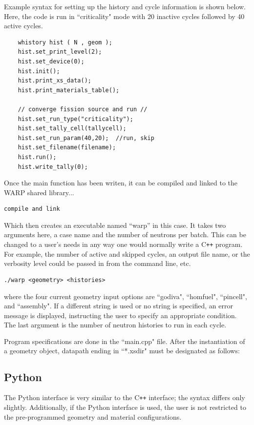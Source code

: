 \documentclass[twoside,a4paper]{refart}
\begin{document}
Example syntax for setting up the history and cycle information is shown below. Here, the code is run in
``criticality" mode with 20 inactive cycles followed by 40 active cycles.

\begin{verbatim}
	whistory hist ( N , geom );
	hist.set_print_level(2);
	hist.set_device(0);
	hist.init();
	hist.print_xs_data();
	hist.print_materials_table();

	// converge fission source and run //
	hist.set_run_type("criticality");
	hist.set_tally_cell(tallycell);
	hist.set_run_param(40,20);  //run, skip
	hist.set_filename(filename);
	hist.run();
	hist.write_tally(0);
\end{verbatim}

Once the main function has been writen, it can be compiled and linked to the WARP shared library...

\begin{verbatim}
compile and link
\end{verbatim}

Which then creates an executable named ``warp'' in this case.  It takes two arguments here, a case name 
and the number of neutrons per batch.  This can be changed to a user's needs in any way one would normally
write a C\texttt{++} program.  For example, the number of active and skipped cycles, an output file name, 
or the verbosity level could be passed in from the command line, etc.

\begin{verbatim}
./warp <geometry> <histories>
\end{verbatim}

where the four current geometry input options are ``godiva", ``homfuel", ``pincell", and ``assembly". If 
a different string is used or no string is specified, an error message is displayed, instructing the 
user to specify an appropriate condition. The last argument is the number of neutron histories to run in 
each cycle.

Program specifications are done in the ``main.cpp" file. After the instantiation of a geometry object, 
datapath ending in ``*.xsdir" must be designated as follows:

\subsection{Python}

The Python interface is very similar to the C\texttt{++} interface; the syntax differs only slightly.
Additionally, if the Python interface is used, the user is not restricted to the pre-programmed 
geometry and material configurations.
\end{document}
